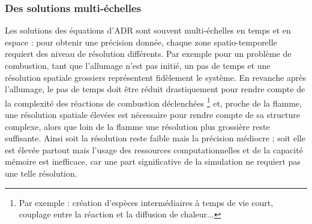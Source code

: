    \subsubsection{Des solutions multi-échelles}
    Les solutions des équations d'ADR sont souvent multi-échelles en temps et en espace \cite{duart2011} : pour obtenir une précision donnée, chaque zone spatio-temporelle 
    requiert des niveau de résolution différents. Par exemple pour un problème de combustion, tant que l'allumage n'est pas initié,
    un pas de temps et une résolution spatiale grossiers représentent fidèlement le système. En revanche après l'allumage,
    le pas de temps doit être réduit drastiquement pour rendre compte de la complexité des réactions de combustion déclenchées
    \footnote{Par exemple : création d'espèces intermédiaires à temps de vie court, couplage entre la réaction et la diffusion de chaleur...} et,
    proche de la flamme, une résolution spatiale élevées est nécessaire pour rendre compte de sa structure complexe, alors que 
    loin de la flamme une résolution plus grossière reste suffisante.
    Ainsi soit la résolution reste faible mais la précision médiocre ; 
    soit elle est élevée partout mais l'usage des ressources computationnelles et de la capacité mémoire est inefficace, 
    car une part significative de la simulation ne requiert pas une telle résolution.

        


